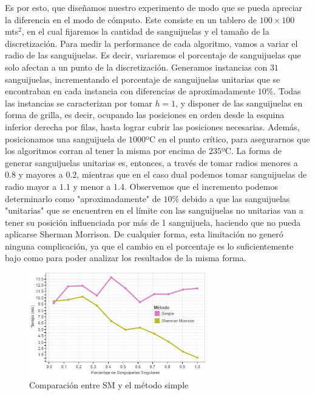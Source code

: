 Es por esto, que dise\~namos nuestro experimento de modo que se pueda apreciar la diferencia en el modo de cómputo. Este consiste en un tablero de $100 \times 100$ mts$^2$, en el cual fijaremos la cantidad de sanguijuelas y el tamaño de la discretizaci\'on. Para medir la performance de cada algoritmo, vamos a variar el radio de las sanguijuelas. Es decir, variaremos el porcentaje de sanguijuelas que solo afectan a un punto de la discretizaci\'on. Generamos instancias con $31$ sanguijuelas, incrementando el porcentaje de sanguijuelas unitarias que se encontraban en cada instancia con diferencias de aproximadamente $10\%$. Todas las instancias se caracterizan por tomar $h = 1$, y disponer de las sanguijuelas en forma de grilla, es decir, ocupando las posiciones en orden desde la esquina inferior derecha por filas, hasta lograr cubrir las posiciones necesarias. Además, posicionamos una sanguijuela de $1000$ºC en el punto crítico, para asegurarnos que los algoritmos corran al tener la misma por encima de $235$ºC. La forma de generar sanguijuelas unitarias es, entonces, a través de tomar radios menores a $0.8$ y mayores a $0.2$, mientras que en el caso dual podemos tomar sanguijuelas de radio mayor a $1.1$ y menor a $1.4$. Observemos que el incremento podemos determinarlo como "aproximadamente" de $10\%$ debido a que las sanguijuelas "unitarias" que se encuentren en el límite con las sanguijuelas no unitarias van a tener su posición influenciada por más de 1 sanguijuela, haciendo que no pueda aplicarse Sherman Morrison. De cualquier forma, esta limitación no generó ninguna complicación, ya que el cambio en el porcentaje es lo suficientemente bajo como para poder analizar los resultados de la misma forma. 

\begin{figure}[h]
    \centering
    \includegraphics[width=0.685\textwidth]{experimento 3-1}
    \caption{Comparación entre SM y el método simple}
    \label{fig:exp31}
\end{figure}

